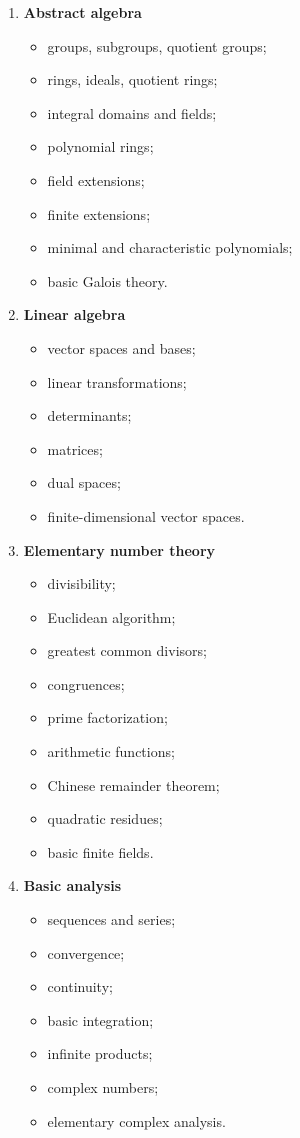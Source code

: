 \documentclass[11pt,a4paper]{article}
\begin{document}
\begin{enumerate}
    \item \textbf{Abstract algebra}
    \begin{itemize}
        \item groups, subgroups, quotient groups;
        \item rings, ideals, quotient rings;
        \item integral domains and fields;
        \item polynomial rings;
        \item field extensions;
        \item finite extensions;
        \item minimal and characteristic polynomials;
        \item basic Galois theory.
    \end{itemize}

    \item \textbf{Linear algebra}
    \begin{itemize}
        \item vector spaces and bases;
        \item linear transformations;
        \item determinants;
        \item matrices;
        \item dual spaces;
        \item finite-dimensional vector spaces.
    \end{itemize}

    \item \textbf{Elementary number theory}
    \begin{itemize}
        \item divisibility;
        \item Euclidean algorithm;
        \item greatest common divisors;
        \item congruences;
        \item prime factorization;
        \item arithmetic functions;
        \item Chinese remainder theorem;
        \item quadratic residues;
        \item basic finite fields.
    \end{itemize}

    \item \textbf{Basic analysis}
    \begin{itemize}
        \item sequences and series;
        \item convergence;
        \item continuity;
        \item basic integration;
        \item infinite products;
        \item complex numbers;
        \item elementary complex analysis.
    \end{itemize}
\end{enumerate}
\end{document}
